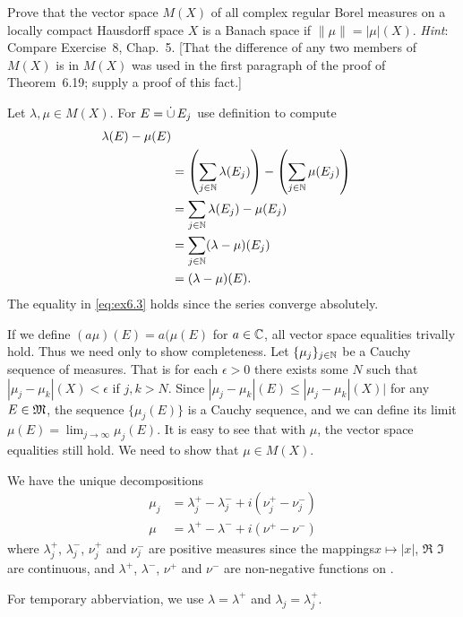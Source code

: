 \begin{enumerate}
\begin{excopy}
Prove that the vector space \(M(X)\) of  all complex regular Borel measures
on a locally compact Hausdorff space $X$ is a Banach space if
\(\|\mu\| = |\mu|(X)\).
\emph{Hint}: Compare Exercise~8, Chap.~5.
[That the difference of any two members of \(M(X)\) is in \(M(X)\)
was used in the first
paragraph of the proof of Theorem~6.19; supply a proof of this fact.]
\end{excopy}

Let \(\lambda,\mu \in M(X)\).
For \(E = \disjunion E_j\) use definition to compute
\begin{align}
\lambda(E) - \mu(E) \notag \\
&= \left(\sum_{j\in\mathbb{N}} \lambda(E_j)\right) -
   \left(\sum_{j\in\mathbb{N}} \mu(E_j)\right) \notag \\
&= \sum_{j\in\mathbb{N}} \lambda(E_j) - \mu(E_j) \label{eq:ex6.3} \\
&= \sum_{j\in\mathbb{N}} (\lambda - \mu)(E_j) \notag \\
&= (\lambda - \mu)(E).
\end{align}
The equality in \eqref{eq:ex6.3} holds since the series converge absolutely.

If we define \((a\mu)(E) = a(\mu(E)\) for \(a\in\mathbb{C}\), all vector space
equalities trivally hold. Thus we need only to show completeness.
Let \(\{\mu_j\}_{j\in\mathbb{N}}\) be a Cauchy sequence of measures.
That is for each \(\epsilon>0\) there exists some $N$ such that
\(|\mu_j - \mu_k|(X) < \epsilon\) if \(j,k>N\).
Since
\(|\mu_j - \mu_k|(E) \leq |\mu_j - \mu_k|(X)|\)
for any \(E\in\mathfrak{M}\), the sequence
\(\{\mu_j(E)\}\) is a Cauchy sequence, and we can define
its limit \(\mu(E) = \lim_{j\to\infty} \mu_j(E)\).
It is easy to see that with \(\mu\), the vector space equalities still hold.
We need to show that \(\mu\in M(X)\).

We have the unique decompositions
\begin{align*}
\mu_j &= \lambda_j^+ - \lambda_j^- + i(\nu_j^+ - \nu_j^-) \\
\mu   &= \lambda^+ - \lambda^- + i(\nu^+ - \nu^-)
\end{align*}
where
\(\lambda_j^+\), \(\lambda_j^-\), \(\nu_j^+\) and \(\nu_j^-\)
are positive measures since
the mappings\(x\mapsto|x|\), \(\Re\) \(\Im\) are continuous,
and
\(\lambda^+\), \(\lambda^-\), \(\nu^+\) and \(\nu^-\)
are non-negative functions on \frakM.

For temporary abberviation, we use
\(\lambda=\lambda^+\) and \(\lambda_j = \lambda_j^+\).


\end{enumerate}
